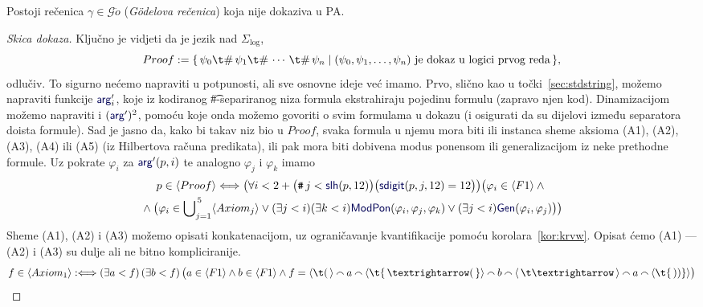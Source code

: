 \begin{teorem}[{name=[Gödelov prvi teorem nepotpunosti]}]\label{tm:goedel}
Postoji rečenica $\gamma\in\mathscr G\ddot o$ (\emph{Gödelova rečenica}) koja nije dokaziva u PA\@.
\end{teorem}
\begin{proof}[Skica dokaza]
Ključno je vidjeti da je jezik nad $\Sigma_{\log}$,
\begin{equation}
    Proof:=\{\,\psi_0\t\#\,\psi_1\t\#\,\dotsb\,\t\#\,\psi_n\mid (\psi_0,\psi_1,\dots,\psi_n)\text{ je dokaz u logici prvog reda}\,\}\text,
\end{equation}
	odlučiv\!. To sigurno nećemo napraviti u potpunosti, ali sve osnovne ideje već imamo. Prvo, slično kao u točki~\ref{sec:stdstring}, možemo napraviti funkcije $\f{arg}'_i$, koje iz kodiranog \t\#-separiranog niza formula ekstrahiraju pojedinu formulu (zapravo njen kod). Dinamizacijom možemo napraviti i $(\f{arg}')^2$, pomoću koje onda možemo govoriti o svim formulama u dokazu (i osigurati da su dijelovi između separatora doista formule). Sad je jasno da, kako bi takav niz bio u $Proof$, svaka formula u njemu mora biti ili instanca sheme aksioma (A1), (A2), (A3), (A4) ili (A5) (iz Hilbertova računa predikata), ili pak mora biti dobivena modus ponensom ili generalizacijom iz neke prethodne formule. Uz pokrate $\varphi_i$ za $\f{arg}'(p,i)$ te analogno $\varphi_j$ i $\varphi_k$ imamo
\begin{multline*}
	p\in\langle Proof\rangle\Longleftrightarrow\bigl(\forall i<2+\bigl(\num j<\f{slh}(p,12)\bigr)\bigl(\f{sdigit}(p,j,12)=12\bigr)\bigr)\bigl(\varphi_i\in\kr{F1}\land{}\\{}\land\bigl(
	\varphi_i\in\bigcup\nolimits_{j=1}^{\,5}\kr{Axiom_j}\lor(\exists j<i)(\exists k<i)\f{ModPon}(\varphi_i,\varphi_j,\varphi_k)\lor(\exists j<i)\f{Gen}(\varphi_i,\varphi_j)\bigr)\bigr)
\end{multline*}
	Sheme (A1), (A2) i (A3) možemo opisati konkatenacijom, uz ograničavanje kvantifikacije pomoću korolara~\ref{kor:krvw}. Opisat ćemo (A1) --- (A2) i (A3) su dulje ali ne bitno kompliciranije.
\begin{equation*}
	f\in\kr{Axiom_1}:\Longleftrightarrow(\exists a<f)\,(\exists b<f)\,\bigl(a\in\kr{F1}\land b\in\kr{F1}\land f=\langle\t(\,\rangle\conc{}a\conc{}\langle\t{\,\textrightarrow(\,}\rangle\conc{}b\conc{}\langle\,\t\textrightarrow\,\rangle\conc{}a\conc{}\langle\t{\,))}\rangle\bigr)
\end{equation*}


\end{proof}
